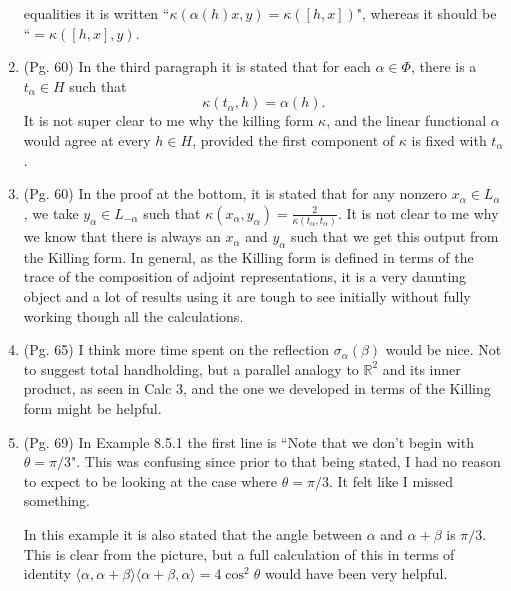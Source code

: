 \documentclass[12pt]{article}
\theoremstyle{definition}
\theoremstyle{definition}
\begin{document}
\begin{enumerate}
            equalities it is written ``$\kappa(\alpha(h)x, y)=\kappa([h, x])$",
            whereas it should be ``$=\kappa([h, x], y)$.
        \item (Pg. 60) In the third paragraph it is stated that for each
            $\alpha\in\Phi$, there is a $t_{\alpha}\in H$ such that
            \begin{equation*}
                \kappa(t_{\alpha}, h)=\alpha(h).
            \end{equation*}
            It is not super clear to me why the killing form $\kappa$, and the
            linear functional $\alpha$ would agree at every $h\in H$, provided
            the first component of $\kappa$ is fixed with $t_{\alpha}$.
        \item (Pg. 60) In the proof at the bottom, it is stated that for any
            nonzero $x_{\alpha}\in L_{\alpha}$, we take $y_{\alpha}\in
            L_{-\alpha}$ such that $\kappa(x_{\alpha},
            y_{\alpha})=\frac{2}{\kappa(t_{\alpha}, t_{\alpha})}$. It is not
            clear to me why we know that there is always an $x_{\alpha}$ and
            $y_{\alpha}$ such that we get this output from the Killing form. In
            general, as the Killing form is defined in terms of the trace of
            the composition of adjoint representations, it is a very daunting
            object and a lot of results using it are tough to see initially
            without fully working though all the calculations.
        \item (Pg. 65) I think more time spent on the reflection
            $\sigma_{\alpha}(\beta)$ would be nice. Not to suggest total
            handholding, but a parallel analogy to $\mathbb{R}^2$ and its inner
            product, as seen in Calc 3, and the one we developed in terms of
            the Killing form might be helpful.
        \item (Pg. 69) In Example 8.5.1 the first line is ``Note that we don't
            begin with $\theta=\pi/3$". This was confusing since prior to
            that being stated, I had no reason to expect to be looking at the
            case where $\theta=\pi/3$. It felt like I missed
            something.\par\hspace{4mm} In this example it is also stated that
            the angle between $\alpha$ and $\alpha+\beta$ is $\pi/3$. This is
            clear from the picture, but a full calculation of this in terms of
            identity $\langle\alpha, \alpha+\beta\rangle\langle\alpha+\beta,
            \alpha\rangle=4\cos^2\theta$ would have been very helpful.
    \end{enumerate}
\end{document}

